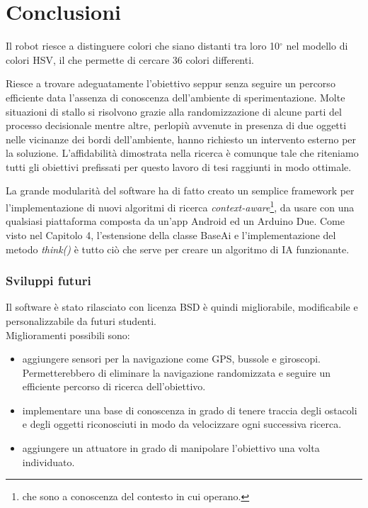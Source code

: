 \chapter*{Conclusioni}
\fancyfoot[C]{\thepage}
Il robot riesce a distinguere colori che siano distanti tra loro 10$^\circ$ nel modello di colori HSV,
il che permette di cercare 36 colori differenti. 

Riesce a trovare adeguatamente 
l'obiettivo seppur senza seguire un percorso efficiente data l'assenza di conoscenza 
dell'ambiente di sperimentazione. Molte situazioni di stallo si risolvono grazie alla randomizzazione 
di alcune parti del processo decisionale mentre altre, perlopiù avvenute in presenza di due 
oggetti nelle vicinanze dei bordi dell'ambiente, hanno richiesto un intervento esterno per la soluzione. 
L'affidabilità dimostrata nella ricerca è comunque tale che riteniamo tutti gli obiettivi 
prefissati per questo lavoro di tesi raggiunti in modo ottimale.

La grande modularità del software ha di fatto creato un semplice framework 
per l'implementazione di nuovi algoritmi di ricerca \emph{context-aware}\footnote{che sono a conoscenza del contesto in cui operano.}, 
da usare con una qualsiasi piattaforma composta da un'app Android ed un Arduino Due. 
Come visto nel Capitolo 4, l'estensione della
classe BaseAi e l'implementazione del metodo \emph{think()} è tutto ciò che serve per
creare un algoritmo di IA funzionante.
\subsection* {Sviluppi futuri}
Il software è stato rilasciato con licenza BSD è quindi migliorabile, 
modificabile e personalizzabile da futuri studenti.
\\Miglioramenti possibili sono:
\begin{itemize}
\item aggiungere sensori per la navigazione come GPS, 
bussole e giroscopi. Permetterebbero di eliminare la navigazione randomizzata e seguire un efficiente percorso di ricerca dell'obiettivo.
\item implementare una base di conoscenza in grado di tenere traccia degli ostacoli e degli oggetti riconosciuti in modo da velocizzare ogni successiva ricerca.
\item aggiungere un attuatore in grado di manipolare l'obiettivo una volta individuato.
\end{itemize}

